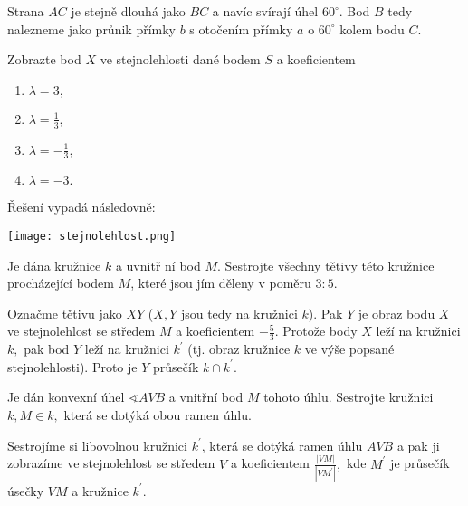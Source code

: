 \begin{reseni}
Strana $AC$ je stejně dlouhá jako $BC$ a navíc svírají úhel $60^\circ$. Bod
$B$ tedy nalezneme jako průnik přímky $b$ s otočením přímky $a$ o $60^\circ$ kolem
bodu $C.$
\end{reseni}

\begin{priklad}
Zobrazte bod $X$ ve stejnolehlosti dané bodem $S$ a koeficientem
\begin{enumerate}[$i.$]
\item $\lambda = 3,$
\item $\lambda = \frac{1}{3},$
\item $\lambda = -\frac{1}{3},$
\item $\lambda = -3.$
\end{enumerate}
\end{priklad}

\begin{reseni}
Řešení vypadá následovně:
\begin{center}
 \texttt{[image: stejnolehlost.png]}
\end{center}
\end{reseni}

\begin{priklad}
Je dána kružnice $k$ a uvnitř ní bod $M$. Sestrojte všechny tětivy této kružnice
procházející bodem $M$, které jsou jím děleny v poměru $3:5.$
\end{priklad}

\begin{reseni}
Označme tětivu jako $XY$ ($X,Y$ jsou tedy na kružnici $k$). Pak $Y$ je obraz
bodu $X$ ve stejnolehlost se středem $M$ a koeficientem $-\frac{5}{3}$. Protože
body $X$ leží na kružnici $k,$ pak bod $Y$ leží na kružnici $k^\prime$ (tj. obraz
kružnice $k$ ve výše popsané stejnolehlosti). Proto je $Y$ průsečík $k\cap k^\prime$.
\end{reseni}

\begin{priklad}
Je dán konvexní úhel $\sphericalangle AVB$ a vnitřní bod $M$ tohoto úhlu. Sestrojte kružnici $k,M\in k,$
která se dotýká obou ramen úhlu.
\end{priklad}

\begin{reseni}
Sestrojíme si libovolnou kružnici $k^\prime$, která se dotýká ramen úhlu $AVB$ a pak
ji zobrazíme ve stejnolehlost se středem $V$ a koeficientem $\frac{|VM|}{|VM^\prime|},$
kde $M^\prime$ je průsečík úsečky $VM$ a kružnice $k^\prime$.
\end{reseni}

